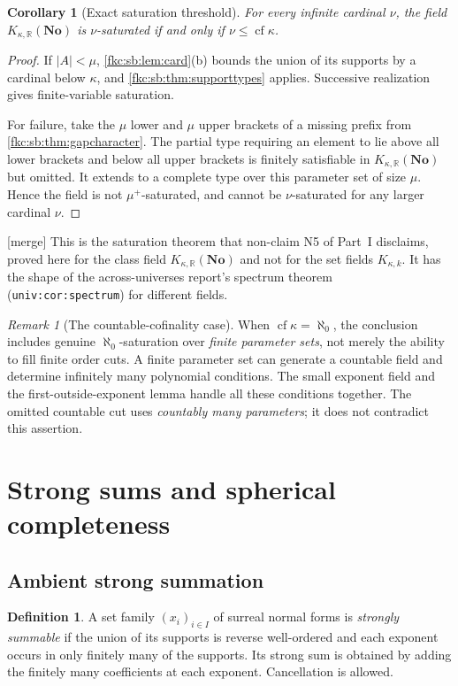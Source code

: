 \documentclass[11pt,letterpaper]{article}
\numberwithin{equation}{section}
\newtheorem{corollary}[theorem]{Corollary}
\theoremstyle{definition}
\newtheorem{definition}[theorem]{Definition}
\theoremstyle{remark}
\newtheorem{remark}[theorem]{Remark}
\newcommand{\R}{\mathbb R}
\newcommand{\No}{\mathbf{No}}
\newcommand{\cf}{\operatorname{cf}}
\newcommand{\K}{K_{\kappa,k}}
\newcommand{\mergetag}{\textup{\textsf{\small[merge]}}}%
\newcommand{\card}[1]{\lvert #1\rvert}
\newcommand{\KN}[2]{K_{#1,#2}(\No)}%
\newcommand{\lbl}[1]{\nolinkurl{#1}}%
\begin{document}
\begin{corollary}[Exact saturation threshold]\label{fkc:sb:cor:saturation}
For every infinite cardinal $\nu$, the field $\KN\kappa\R$ is $\nu$-saturated if and only if $\nu\le\cf\kappa$.
\end{corollary}
\begin{proof}
If $\card A<\mu$, \cref{fkc:sb:lem:card}(b) bounds the union of its supports by a cardinal below $\kappa$, and \cref{fkc:sb:thm:supporttypes} applies. Successive realization gives finite-variable saturation.

For failure, take the $\mu$ lower and $\mu$ upper brackets of a missing prefix from \cref{fkc:sb:thm:gapcharacter}. The partial type requiring an element to lie above all lower brackets and below all upper brackets is finitely satisfiable in $\KN\kappa\R$ but omitted. It extends to a complete type over this parameter set of size $\mu$. Hence the field is not $\mu^+$-saturated, and cannot be $\nu$-saturated for any larger cardinal $\nu$.
\end{proof}
\mergetag{} This is the saturation theorem that non-claim N5 of Part~I disclaims, proved here for the class field $\KN\kappa\R$ and not for the set fields $\K$. It has the shape of the across-universes report's spectrum theorem (\lbl{univ:cor:spectrum}) for different fields.

\begin{remark}[The countable-cofinality case]\label{fkc:sb:rem:countablecf}
When $\cf\kappa=\aleph_0$, the conclusion includes genuine $\aleph_0$-saturation over \emph{finite parameter sets}, not merely the ability to fill finite order cuts. A finite parameter set can generate a countable field and determine infinitely many polynomial conditions. The small exponent field and the first-outside-exponent lemma handle all these conditions together. The omitted countable cut uses \emph{countably many parameters}; it does not contradict this assertion.
\end{remark}

\section{Strong sums and spherical completeness}\label{fkc:sb:sec:spherical}

\subsection{Ambient strong summation}
\begin{definition}\label{fkc:sb:def:strong}
A set family $(x_i)_{i\in I}$ of surreal normal forms is \emph{strongly summable} if the union of its supports is reverse well-ordered and each exponent occurs in only finitely many of the supports. Its strong sum is obtained by adding the finitely many coefficients at each exponent. Cancellation is allowed.
\end{definition}
\end{document}
